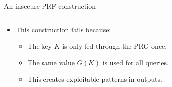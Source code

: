 \documentclass[aspectratio=169, lualatex, handout]{beamer}
\begin{document}
\begin{frame}{An insecure PRF construction}
	\begin{columns}[c]
		\begin{column}{0.45\textwidth}
			\begin{itemize}[<+->]
				\item This construction fails because:
				      \begin{itemize}[<+->]
					      \item The key $K$ is only fed through the PRG once.
					      \item The same value $G(K)$ is used for all queries.
					      \item This creates exploitable patterns in outputs.
				      \end{itemize}
			\end{itemize}
		\end{column}
		\begin{column}{0.55\textwidth}
			\begin{center}
			\end{center}
		\end{column}
	\end{columns}
\end{frame}
\end{document}
